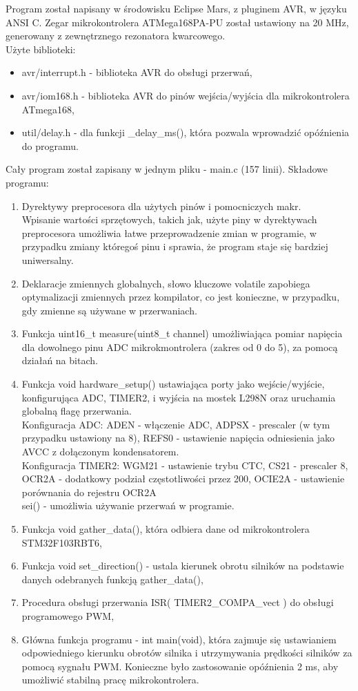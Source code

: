 \documentclass[a4paper,12pt,twoside,openany]{report}
\begin{document}
Program został napisany w środowisku Eclipse Mars, z pluginem AVR, w języku ANSI C. Zegar mikrokontrolera ATMega168PA-PU został ustawiony na 20 MHz, generowany z zewnętrznego rezonatora kwarcowego.\\
Użyte biblioteki:
\begin{itemize}
\item avr/interrupt.h - biblioteka AVR do obsługi przerwań,
\item avr/iom168.h - biblioteka AVR do pinów wejścia/wyjścia dla mikrokontrolera ATmega168,
\item util/delay.h - dla funkcji \_delay\_ms(), która pozwala wprowadzić opóźnienia do programu.
\end{itemize}
Cały program został zapisany w jednym pliku - main.c (157 linii). Składowe programu:
\begin{enumerate}
\item Dyrektywy preprocesora dla użytych pinów i pomocniczych makr.\\
Wpisanie wartości sprzętowych, takich jak, użyte piny w dyrektywach preprocesora umożliwia łatwe przeprowadzenie zmian w programie, w przypadku zmiany któregoś pinu i sprawia, że program staje się bardziej uniwersalny.
\item Deklaracje zmiennych globalnych, słowo kluczowe volatile zapobiega optymalizacji zmiennych przez kompilator, co jest konieczne, w przypadku, gdy zmienne są używane w przerwaniach.
\item Funkcja uint16\_t measure(uint8\_t channel) umożliwiająca pomiar napięcia dla dowolnego pinu ADC mikrokmontrolera (zakres od 0 do 5), za pomocą działań na bitach.
\item Funkcja void hardware\_setup() ustawiająca porty jako wejście/wyjście, konfigurująca ADC, TIMER2, i wyjścia na mostek L298N oraz uruchamia globalną flagę przerwania.\\
Konfiguracja ADC: ADEN - włączenie ADC, ADPSX - prescaler (w tym przypadku ustawiony na 8), REFS0 - ustawienie napięcia odniesienia jako AVCC z dołączonym kondensatorem.\\
Konfiguracja TIMER2: WGM21 - ustawienie trybu CTC, CS21 - prescaler 8, OCR2A - dodatkowy podział częstotliwości przez 200, OCIE2A - ustawienie porównania do rejestru OCR2A\\
sei() - umożliwia używanie przerwań w programie.
\item Funkcja void gather\_data(), która odbiera dane od mikrokontrolera STM32F103RBT6,
\item Funkcja void set\_direction() - ustala kierunek obrotu silników na podstawie danych odebranych funkcją gather\_data(),
\item Procedura obsługi przerwania ISR( TIMER2\_COMPA\_vect ) do obsługi programowego PWM,
\item Główna funkcja programu - int main(void), która zajmuje się ustawianiem odpowiedniego kierunku obrotów silnika i utrzymywania prędkości silników za pomocą sygnału PWM. Konieczne było zastosowanie opóźnienia 2 ms, aby umożliwić stabilną pracę mikrokontrolera.
\end{enumerate}
\end{document}
